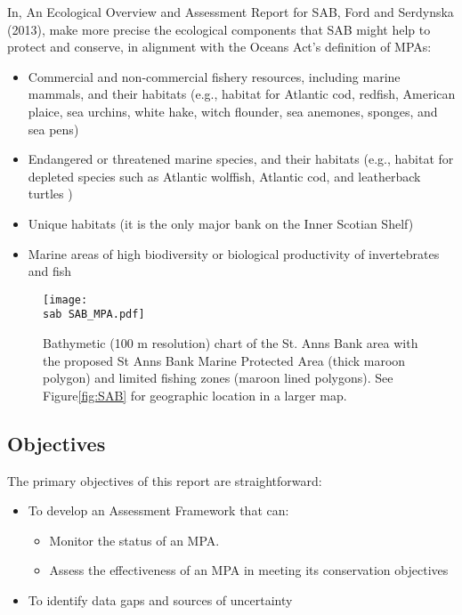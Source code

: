 \documentclass[letterpaper,portrait,11pt]{scrartcl}
\numberwithin{equation}{section}		%
\numberwithin{figure}{section}			%
\numberwithin{table}{section}				%
\newcommand{\ecomod}{\string~/ecomod_data/}   %
\newcommand{\sab}{\ecomod/mpa/sab/}   %
\newcommand{\analysis}{\ecomod/mpa/analysis/}   %
\begin{document}
In, An Ecological Overview and Assessment Report for SAB, Ford and Serdynska (2013), make more precise the ecological components that SAB might help to protect and conserve, in alignment with the Oceans Act's definition of MPAs:

\begin{itemize}
	\item Commercial and non-commercial fishery resources, including marine mammals, and their habitats (e.g., habitat for Atlantic cod, redfish, American plaice, sea urchins, white hake, witch flounder, sea anemones, sponges, and sea pens)
  \item Endangered or threatened marine species, and their habitats (e.g., habitat for depleted species such as Atlantic wolffish, Atlantic cod, and leatherback turtles )
  \item Unique habitats (it is the only major bank on the Inner Scotian Shelf)
  \item Marine areas of high biodiversity or biological productivity of invertebrates and fish
\end{itemize}

\begin{figure}[h]
  \label{fig:SABCloseup}
  \centering
  \texttt{[image: \\sab SAB\_MPA.pdf]}
  \caption{Bathymetic (100 m resolution) chart of the  St. Anns Bank area with the proposed St Anns Bank Marine Protected Area (thick maroon polygon) and limited fishing zones (maroon lined polygons). See Figure\ref{fig:SAB} for geographic location in a larger map.}
\end{figure}

\subsection{Objectives}

The primary objectives of this report are straightforward:

\begin{itemize}
	\item To develop an Assessment Framework that can:
  \begin{itemize}
    \item	Monitor the status of an MPA.
  	\item Assess the effectiveness of an MPA in meeting its conservation objectives
  \end{itemize}
  \item To identify data gaps and sources of uncertainty 
\end{itemize}
\end{document}
